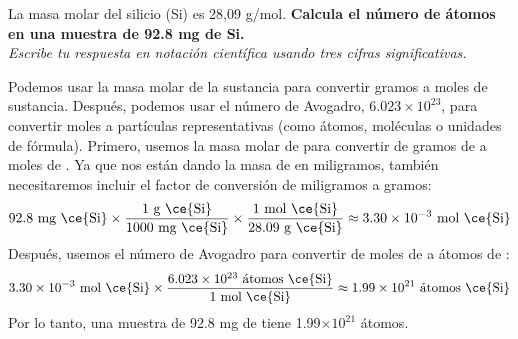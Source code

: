 La masa molar del silicio (Si) es 28,09 g/mol.
\textbf{Calcula el número de átomos en una muestra de 92.8 mg de Si.}\\
\emph{Escribe tu respuesta en notación científica usando tres cifras significativas.}

\begin{solutionbox}{7cm}
    Podemos usar la masa molar de la sustancia para convertir gramos a moles de sustancia. Después, podemos usar el número de Avogadro,  $6.023 \times 10^{23}$, para convertir moles a  partículas representativas (como átomos, moléculas o unidades de fórmula).
    Primero, usemos la masa molar de  para convertir de gramos de  a moles de . Ya que nos están dando la masa de  en miligramos, también necesitaremos incluir el factor de conversión de miligramos a gramos:
    \[92.8 \text{ mg \ce{Si}} \times \frac{1 \text{ g \ce{Si}}}{1000 \text{ mg \ce{Si}}} \times \frac{1 \text{ mol \ce{Si}}}{28.09 \text{ g \ce{Si}}} \approx 3.30 \times 10^{-3} \text{ mol \ce{Si}} \]
    Después, usemos el número de Avogadro para convertir de moles de  a átomos de :
    \[3.30 \times 10^{-3} \text{ mol \ce{Si}} \times \frac{6.023 \times 10^{23} \text{ átomos \ce{Si}}}{1 \text{ mol \ce{Si}}} \approx 1.99 \times 10^{21} \text{ átomos \ce{Si}} \]
    Por lo tanto, una muestra de 92.8 mg de  tiene 1.99$\times 10^{21}$ átomos.
\end{solutionbox}
